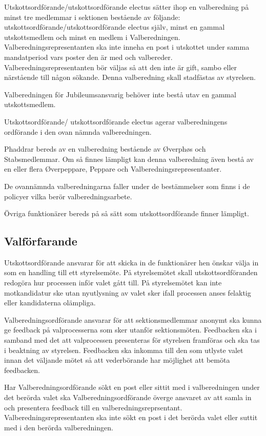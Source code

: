 \documentclass{dsekprotokoll}
\begin{document}
Utskottsordförande/utskottsordförande electus sätter ihop en valberedning på minst tre medlemmar i sektionen bestående av följande: utskottsordförande/utskottsordförande electus själv, minst en gammal utskottsmedlem och minst en medlem i Valberedningen. Valberedningsrepresentanten ska inte inneha en post i utskottet under samma mandatperiod vars poster den är med och valbereder. Valberedningsrepresentanten bör väljas så att den inte är gift, sambo eller närstående till någon sökande. Denna valberedning skall stadfästas av styrelsen.

Valberedningen för Jubileumsansvarig behöver inte bestå utav en gammal utskottsmedlem.

Utskottsordförande/ utskottsordförande electus agerar valberedningens ordförande i den ovan nämnda valberedningen.


Phaddrar bereds av en valberedning bestående av Øverphøs och Stabsmedlemmar. Om så
finnes lämpligt kan denna valberedning även bestå av en eller flera Øverpeppare, Peppare
och Valberedningsrepresentanter.

De ovannämnda valberedningarna faller under de bestämmelser som finns i de policyer
vilka berör valberedningsarbete.

Övriga funktionärer bereds på så sätt som utskottsordförande finner lämpligt.

\subsection{Valförfarande}
Utskottsordförande ansvarar för att skicka in de funktionärer hen önskar välja in som en handling till ett styrelsemöte. På styrelsemötet skall utskottsordföranden redogöra hur processen inför valet gått till. På styrelsemötet kan inte motkandidatur ske utan nyutlysning av valet sker ifall processen anses felaktig eller kandidaterna olämpliga.

Valberedningsordförande ansvarar för att sektionsmedlemmar anonymt ska kunna ge
feedback på valprocesserna som sker utanför sektionsmöten. Feedbacken ska i samband
med det att valprocessen presenteras för styrelsen framföras och ska tas i beaktning av
styrelsen. Feedbacken ska inkomma till den som utlyste valet innan det väljande mötet
så att vederbörande har möjlighet att bemöta feedbacken.

Har Valberedningsordförande sökt en post eller sittit med i valberedningen under det berörda valet ska Valberedningsordförande överge ansvaret av att samla in och presentera
feedback till en valberedningsreprsentant. Valberedningsrepresentanten ska inte sökt en
post i det berörda valet eller suttit med i den berörda valberedningen.
\end{document}
